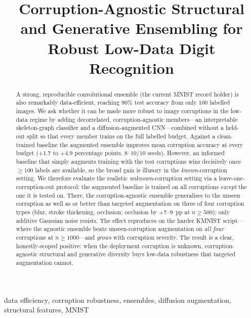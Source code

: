 \documentclass[conference]{IEEEtran}
\begin{document}
\title{Corruption-Agnostic Structural and Generative Ensembling for\\
       Robust Low-Data Digit Recognition}

\author{
        }

\maketitle

\begin{abstract}
A strong, reproducible convolutional ensemble (the current MNIST record holder) is also
remarkably data-efficient, reaching $90\%$ test accuracy from only $100$ labelled images.
We ask whether it can be made more robust to image corruptions in the low-data regime by
adding decorrelated, corruption-agnostic members---an interpretable skeleton-graph
classifier and a diffusion-augmented CNN---combined without a held-out split so that every
member trains on the full labelled budget. Against a clean-trained baseline the augmented
ensemble improves mean corruption accuracy at every budget ($+1.7$ to $+4.9$ percentage
points, $8$--$10/10$ seeds). However, an informed baseline that simply augments training
with the test corruptions wins decisively once $\geq\!100$ labels are available, so the
broad gain is illusory in the \emph{known}-corruption setting. We therefore evaluate the
realistic \emph{unknown}-corruption setting via a leave-one-corruption-out protocol: the
augmented baseline is trained on all corruptions \emph{except} the one it is tested on.
There, the corruption-agnostic ensemble generalises to the unseen corruption as well as or
better than targeted augmentation on three of four corruption types (blur, stroke
thickening, occlusion; occlusion by $+7$--$9$~pp at $n\!\geq\!500$); only additive Gaussian
noise resists. The effect reproduces on the harder KMNIST script---where the agnostic ensemble
beats unseen-corruption augmentation on \emph{all four} corruptions at $n\!\geq\!1000$---and
\emph{grows} with corruption severity. The result is a clear, honestly-scoped positive: when the deployment
corruption is unknown, corruption-agnostic structural and generative diversity buys low-data
robustness that targeted augmentation cannot.
\end{abstract}

\begin{IEEEkeywords}
data efficiency, corruption robustness, ensembles, diffusion augmentation, structural
features, MNIST
\end{IEEEkeywords}
\end{document}
